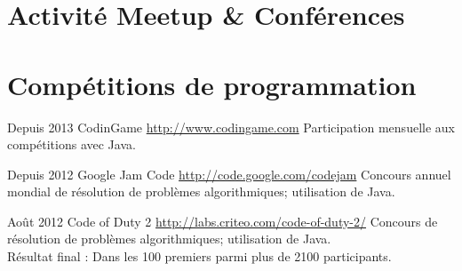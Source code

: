 \documentclass[11pt,a4paper]{moderncv}
\begin{document}


\section{Activité Meetup \& Conférences}

\section{Compétitions de programmation}

\cventry
{Depuis 2013}
{CodinGame}
{}
{\url{http://www.codingame.com}}
{}
{Participation mensuelle aux compétitions avec Java.}

\cventry
{Depuis 2012}
{Google Jam Code}
{}
{\url{http://code.google.com/codejam}}
{}
{Concours annuel mondial de résolution de problèmes algorithmiques; utilisation de Java.}




\cventry
{Août 2012}
{Code of Duty 2}
{}
{\url{http://labs.criteo.com/code-of-duty-2/}}
{}
{Concours de résolution de problèmes algorithmiques; utilisation de Java.\\Résultat final : Dans les 100 premiers parmi plus de 2100 participants.}
\end{document}
